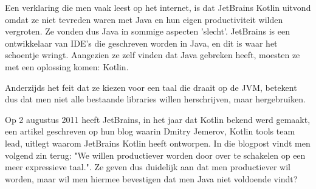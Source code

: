 Een verklaring die men vaak leest op het internet, is dat JetBrains Kotlin uitvond omdat ze niet tevreden waren met Java en hun eigen productiviteit wilden vergroten. Ze vonden dus Java in sommige aspecten 'slecht'. JetBrains is een ontwikkelaar van IDE's die geschreven worden in Java, en dit is waar het schoentje wringt. Aangezien ze zelf vinden dat Java gebreken heeft, moesten ze met een oplossing komen: Kotlin.

Anderzijds het feit dat ze kiezen voor een taal die draait op de JVM, betekent dus dat men niet alle bestaande libraries willen herschrijven, maar hergebruiken.

Op 2 augustus 2011 heeft JetBrains, in het jaar dat Kotlin bekend werd gemaakt, een artikel geschreven op hun blog \textcite{JetBrainsNeedKotlin} waarin Dmitry Jemerov, Kotlin tools team lead, uitlegt waarom JetBrains Kotlin heeft ontworpen. In die blogpost vindt men volgend zin terug: "We willen productiever worden door over te schakelen op een meer expressieve taal.". Ze geven dus duidelijk aan dat men productiever wil worden, maar wil men hiermee bevestigen dat men Java niet voldoende vindt?




